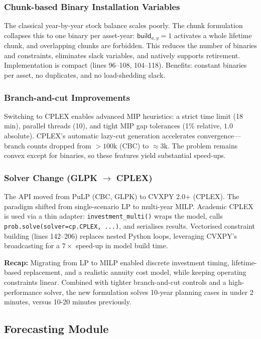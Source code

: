 \subsubsection{Chunk-based Binary Installation Variables}

The classical year-by-year stock balance scales poorly. The chunk formulation collapses this to one binary per asset-year: 
$\textsf{build}_{a,y}=1$ activates a whole lifetime chunk, and overlapping chunks are forbidden. This reduces the number of 
binaries and constraints, eliminates slack variables, and natively supports retirement. Implementation is compact 
(lines 96--108, 104--118). Benefits: constant binaries per asset, no duplicates, and no load-shedding slack.

\subsubsection{Branch-and-cut Improvements}

Switching to CPLEX enables advanced MIP heuristics: a strict time limit (18 min), parallel threads (10), and tight MIP 
gap tolerances (1\% relative, $1.0$ absolute). CPLEX's automatic lazy-cut generation accelerates convergence---branch counts 
dropped from $>100$k (CBC) to $\approx 3$k. The problem remains convex except for binaries, so these features yield substantial 
speed-ups.

\subsubsection{Solver Change (GLPK $\rightarrow$ CPLEX)}

The API moved from PuLP (CBC, GLPK) to CVXPY 2.0+ (CPLEX). The paradigm shifted from single-scenario LP to multi-year MILP. 
Academic CPLEX is used via a thin adapter: \texttt{investment\_multi()} wraps the model, calls 
\texttt{prob.solve(solver=cp.CPLEX, ...)}, and serialises results. Vectorised constraint building (lines 142--206) replaces 
nested Python loops, leveraging CVXPY's broadcasting for a $7\times$ speed-up in model build time.

\textbf{Recap:} Migrating from LP to MILP enabled discrete investment timing, lifetime-based replacement, and a realistic 
annuity cost model, while keeping operating constraints linear. Combined with tighter branch-and-cut controls and a 
high-performance solver, the new formulation solves 10-year planning cases in under 2 minutes, versus 10-20 minutes
previously.

\subsection{Forecasting Module}
\label{sec:forecasting-module}

